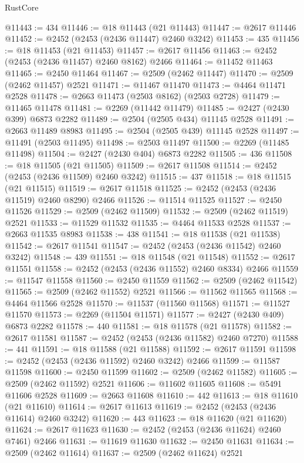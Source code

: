 \begin{lexlean}{RustCore}
\begin{coremodule}
@11443 := 434
@11446 := @18 @11443 (@21 @11443)
@11447 := @2617 @11446
@11452 := @2452 (@2453 (@2436 @11447) @2460 @3242)
@11453 := 435
@11456 := @18 @11453 (@21 @11453)
@11457 := @2617 @11456
@11463 := @2452 (@2453 (@2436 @11457) @2460 @8162) @2466
@11464 := @11452 @11463
@11465 := @2450 @11464
@11467 := @2509 (@2462 @11447)
@11470 := @2509 (@2462 @11457) @2521
@11471 := @11467 @11470
@11473 := @4464 @11471 @2528
@11478 := @2663 @11473 (@2503 @8162) (@2503 @2728)
@11479 := @11465 @11478
@11481 := @2269 (@11442 @11479)
@11485 := @2427 (@2430 @399) @6873 @2282
@11489 := @2504 (@2505 @434) @11145 @2528
@11491 := @2663 @11489 @8983
@11495 := @2504 (@2505 @439) @11145 @2528
@11497 := @11491 (@2503 @11495)
@11498 := @2503 @11497
@11500 := @2269 (@11485 @11498)
@11504 := @2427 (@2430 @404) @6873 @2282
@11505 := 436
@11508 := @18 @11505 (@21 @11505)
@11509 := @2617 @11508
@11514 := @2452 (@2453 (@2436 @11509) @2460 @3242)
@11515 := 437
@11518 := @18 @11515 (@21 @11515)
@11519 := @2617 @11518
@11525 := @2452 (@2453 (@2436 @11519) @2460 @8290) @2466
@11526 := @11514 @11525
@11527 := @2450 @11526
@11529 := @2509 (@2462 @11509)
@11532 := @2509 (@2462 @11519) @2521
@11533 := @11529 @11532
@11535 := @4464 @11533 @2528
@11537 := @2663 @11535 @8983
@11538 := 438
@11541 := @18 @11538 (@21 @11538)
@11542 := @2617 @11541
@11547 := @2452 (@2453 (@2436 @11542) @2460 @3242)
@11548 := 439
@11551 := @18 @11548 (@21 @11548)
@11552 := @2617 @11551
@11558 := @2452 (@2453 (@2436 @11552) @2460 @8334) @2466
@11559 := @11547 @11558
@11560 := @2450 @11559
@11562 := @2509 (@2462 @11542)
@11565 := @2509 (@2462 @11552) @2521
@11566 := @11562 @11565
@11568 := @4464 @11566 @2528
@11570 := @11537 (@11560 @11568)
@11571 := @11527 @11570
@11573 := @2269 (@11504 @11571)
@11577 := @2427 (@2430 @409) @6873 @2282
@11578 := 440
@11581 := @18 @11578 (@21 @11578)
@11582 := @2617 @11581
@11587 := @2452 (@2453 (@2436 @11582) @2460 @7270)
@11588 := 441
@11591 := @18 @11588 (@21 @11588)
@11592 := @2617 @11591
@11598 := @2452 (@2453 (@2436 @11592) @2460 @3242) @2466
@11599 := @11587 @11598
@11600 := @2450 @11599
@11602 := @2509 (@2462 @11582)
@11605 := @2509 (@2462 @11592) @2521
@11606 := @11602 @11605
@11608 := @5491 @11606 @2528
@11609 := @2663 @11608
@11610 := 442
@11613 := @18 @11610 (@21 @11610)
@11614 := @2617 @11613
@11619 := @2452 (@2453 (@2436 @11614) @2460 @3242)
@11620 := 443
@11623 := @18 @11620 (@21 @11620)
@11624 := @2617 @11623
@11630 := @2452 (@2453 (@2436 @11624) @2460 @7461) @2466
@11631 := @11619 @11630
@11632 := @2450 @11631
@11634 := @2509 (@2462 @11614)
@11637 := @2509 (@2462 @11624) @2521

\end{coremodule}
\end{lexlean}
